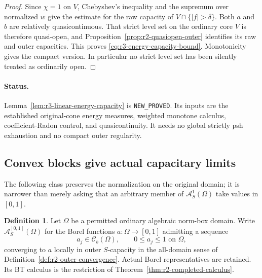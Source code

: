 \documentclass[11pt,a4paper]{article}
\numberwithin{equation}{section}
\theoremstyle{definition}
\newtheorem{definition}[theorem]{Definition}
\theoremstyle{remark}
\newcommand{\Cb}{\mathcal C_b}
\begin{document}
\begin{proof}
Since $\chi=1$ on $V$, Chebyshev's inequality and the supremum
over normalized $w$ give the estimate for the raw capacity of
$V\cap\{|f|>\delta\}$. Both $a$ and $b$ are relatively
quasicontinuous. That strict level set on the ordinary core $V$
is therefore quasi-open, and
Proposition~\ref{prop:r2-quasiopen-outer} identifies its raw and
outer capacities. This proves
\eqref{eq:r3-energy-capacity-bound}. Monotonicity gives the compact
version. In particular no strict level set has been silently
treated as ordinarily open.
\end{proof}

\paragraph{Status.}
Lemma~\ref{lem:r3-linear-energy-capacity} is
\texttt{NEW\_PROVED}. Its inputs are the established original-cone
energy measures, weighted monotone calculus, coefficient-Radon
control, and quasicontinuity. It needs no global strictly psh
exhaustion and no compact outer regularity.

\subsection{Convex blocks give actual capacitary limits}

The following class preserves the normalization on the original
domain; it is narrower than merely asking that an arbitrary
member of $\mathcal A_S^1(\Omega)$ take values in $[0,1]$.

\begin{definition}
\label{def:r3-normalized-completion}
Let $\Omega$ be a permitted ordinary algebraic norm-box domain.
Write $\mathcal A_S^{[0,1]}(\Omega)$ for the Borel functions
$a:\Omega\to[0,1]$ admitting a sequence
\[
 a_j\in\Cb(\Omega),\qquad 0\leq a_j\leq1\text{ on }\Omega,
\]
converging to $a$ locally in outer $S$-capacity in the all-domain
sense of Definition~\ref{def:r2-outer-convergence}. Actual Borel
representatives are retained. Its BT calculus is the restriction
of Theorem~\ref{thm:r2-completed-calculus}.
\end{definition}
\end{document}
